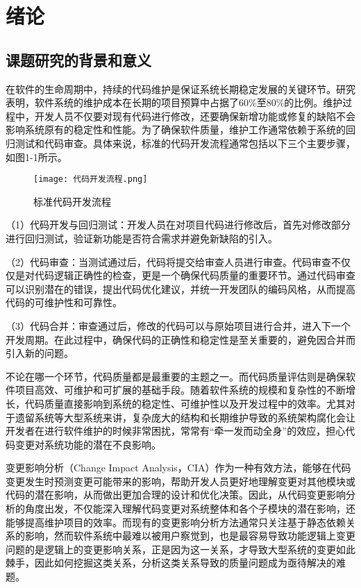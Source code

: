 
\chapter{绪论}

\section{课题研究的背景和意义}

在软件的生命周期中，持续的代码维护是保证系统长期稳定发展的关键环节。研究表明，软件系统的维护成本在长期的项目预算中占据了60\%至80\%的比例\cite{2012Maintenance}。维护过程中，开发人员不仅要对现有代码进行修改，还要确保新增功能或修复的缺陷不会影响系统原有的稳定性和性能。为了确保软件质量，维护工作通常依赖于系统的回归测试和代码审查。具体来说，标准的代码开发流程通常包括以下三个主要步骤，如图1-1所示。

\begin{figure}[h]
\centering
\texttt{[image: 代码开发流程.png]}
\caption{标准代码开发流程}
\end{figure}

（1）代码开发与回归测试：开发人员在对项目代码进行修改后，首先对修改部分进行回归测试，验证新功能是否符合需求并避免新缺陷的引入。

（2）代码审查：当测试通过后，代码将提交给审查人员进行审查。代码审查不仅仅是对代码逻辑正确性的检查，更是一个确保代码质量的重要环节。通过代码审查可以识别潜在的错误，提出代码优化建议，并统一开发团队的编码风格，从而提高代码的可维护性和可靠性。

（3）代码合并：审查通过后，修改的代码可以与原始项目进行合并，进入下一个开发周期。在此过程中，确保代码的正确性和稳定性是至关重要的，避免因合并而引入新的问题。

不论在哪一个环节，代码质量都是最重要的主题之一。而代码质量评估则是确保软件项目高效、可维护和可扩展的基础手段。随着软件系统的规模和复杂性的不断增长，代码质量直接影响到系统的稳定性、可维护性以及开发过程中的效率。尤其对于遗留系统等大型系统来讲，复杂庞大的结构和长期维护导致的系统架构腐化会让开发者在进行软件维护的时候非常困扰，常常有“牵一发而动全身”的效应，担心代码变更对系统功能的潜在不良影响。

变更影响分析（Change Impact Analysis，CIA）作为一种有效方法，能够在代码变更发生时预测变更可能带来的影响，帮助开发人员更好地理解变更对其他模块或代码的潜在影响，从而做出更加合理的设计和优化决策。因此，从代码变更影响分析的角度出发，不仅能深入理解代码变更对系统整体和各个子模块的潜在影响，还能够提高维护项目的效率\cite{2022An}。而现有的变更影响分析方法通常只关注基于静态依赖关系的影响，然而软件系统中最难以被用户察觉到，也是最容易导致功能逻辑上变更问题的是逻辑上的变更影响关系，正是因为这一关系，才导致大型系统的变更如此棘手，因此如何挖掘这类关系，分析这类关系导致的质量问题成为亟待解决的难题。

